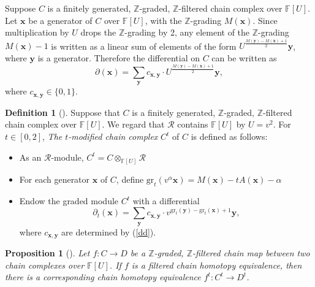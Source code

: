 \documentclass[12pt]{amsart}
\theoremstyle{plain}
\theoremstyle{definition}
\newtheorem{dfn}[thm]{Definition}
\theoremstyle{plain}
\newtheorem{prop}[thm]{Proposition}
\theoremstyle{definition}
\newcommand{\Z}{\mathbb{Z}}
\numberwithin{equation}{section}
\begin{document}
Suppose $C$ is a finitely generated, $\Z$-graded, $\Z$-filtered chain complex over $\mathbb{F}[U]$.
Let $\mathbf{x}$ be a generator of $C$ over $\mathbb{F}[U]$, with the $\Z$-grading $M(\mathbf{x})$.
Since multiplication by $U$ drops the $\Z$-grading by 2, any element of the $\Z$-grading $M(\mathbf{x})-1$ is written as a linear sum of elements of the form $U^{\frac{M(\mathbf{y})-M(\mathbf{x})+1}{2}}\mathbf{y}$, where $\mathbf{y}$ is a generator.
Therefore the differential on $C$ can be written as
\begin{equation}
\label{dd}
\partial(\mathbf{x})=\sum_{\mathbf{y}}c_{\mathbf{x},\mathbf{y}}\cdot U^{\frac{M(\mathbf{y})-M(\mathbf{x})+1}{2}}\mathbf{y},
\end{equation}
where $c_{\mathbf{x},\mathbf{y}}\in\{0,1\}$.

\begin{dfn}[{\cite[Definition 4.1]{Concordance-homomorphisms-from-knot-Floer-homology}}]
\label{dfn:t-mod}
Suppose that $C$ is a finitely generated, $\Z$-graded, $\Z$-filtered chain complex over $\mathbb{F}[U]$.
We regard that $\mathcal{R}$ contains $\mathbb{F}[U]$ by $U=v^2$.
For $t\in[0,2]$, \textit{The $t$-modified chain complex} $C^t$ of $C$ is defined as follows$\colon$
\begin{itemize}
\item As an $\mathcal{R}$-module, $C^t=C\otimes_{\mathbb{F}[U]}\mathcal{R}$
\item For each generator $\mathbf{x}$ of $C$, define $\mathrm{gr}_t(v^\alpha\mathbf{x})=M(\mathbf{x})-tA(\mathbf{x})-\alpha$
\item Endow the graded module $C^t$ with a differential
\begin{equation}
\label{differential_formal}
\partial_t(\mathbf{x})=\sum_{\mathbf{y}}c_{\mathbf{x},\mathbf{y}}\cdot v^{\mathrm{gr}_t(\mathbf{y})-\mathrm{gr}_t(\mathbf{x})+1}\mathbf{y},
\end{equation}
where $c_{\mathbf{x},\mathbf{y}}$ are determined by (\ref{dd}).
\end{itemize}
\end{dfn}

\begin{prop}[{\cite[Proposition 4.4]{Concordance-homomorphisms-from-knot-Floer-homology}}]
\label{prop:f-f^t}
Let $f\colon C\to D$ be a $\Z$-graded, $\Z$-filtered chain map between two chain complexes over $\mathbb{F}[U]$.
If $f$ is a filtered chain homotopy equivalence, then there is a corresponding chain homotopy equivalence $f^t\colon C^t\to D^t$.
\end{prop}
\end{document}
